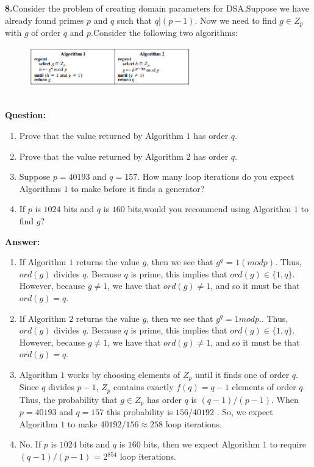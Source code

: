 \documentclass[paper=a4, fontsize=11pt]{scrartcl} %
\numberwithin{equation}{section} %
\numberwithin{figure}{section} %
\numberwithin{table}{section} %
\begin{document}
\textbf{8.}Consider the problem of creating domain parameters for DSA.Suppose we have already found primes $p$ and $q$ such that $q$|$(p-1)$. Now we need to find $g \in Z_p$ with $g$ of order $q$ and $p$.Consider the following two algorithms:
\begin{figure}[htbp]
  \centering
  \includegraphics[width=7cm]{1.eps}
  \label{5-1}
\end{figure}
\\
\textbf{Question:}
\begin{enumerate}
\item Prove that the value returned by Algorithm $1$ has order $q$.
\item Prove that the value returned by Algorithm $2$ has order $q$.
\item Suppose $p = 40193$ and $q = 157$. How many loop iterations do you expect Algorithms $1$ to make before it finds a generator?
\item If $p$ is $1024$ bits and $q$ is $160$ bits,would you recommend using Algorithm $1$ to find $g$?
\end{enumerate}

\textbf{Answer:}
\begin{enumerate}
\item If Algorithm $1$ returns the value $g$, then we see that $g^q$ = $1 (mod p)$. Thus, $ord(g)$ divides $q$. Because $q$ is prime, this implies that $ord(g) \in \{1,q\}$. However, because $g \neq  1$, we have that $ord(g) \neq 1$, and so it must be that $ord(g) = q$.
\item If Algorithm $2$ returns the value $g$, then we see that $g^q = 1 mod p$.. Thus, $ord(g)$ divides $q$. Because $q$ is prime, this implies that $ord(g) \in \{1,q\}$. However, because $g \neq 1$, we have that $ord(g) \neq 1$, and so it must be that $ord(g) = q$.
\item Algorithm $1$ works by choosing elements of $Z_p$ until it finds one of order $q$. Since $q$ divides $p-1$, $Z_p$ contains exactly $f(q) = q - 1$ elements of order $q$. Thus, the probability that $g \in Z_p$ has order $q$ is $(q - 1)/(p - 1)$. When $p = 40193$ and $q = 157$ this probability is $156/40192$ . So, we expect Algorithm $1$ to make $40192/156  \approx  258$ loop iterations.
\item No. If $p$ is $1024$ bits and $q$ is $160$ bits, then we expect Algorithm $1$ to require $(q-1)/(p-1)$  = 2$^{854}$  loop iterations.
\end{enumerate}
\end{document}
